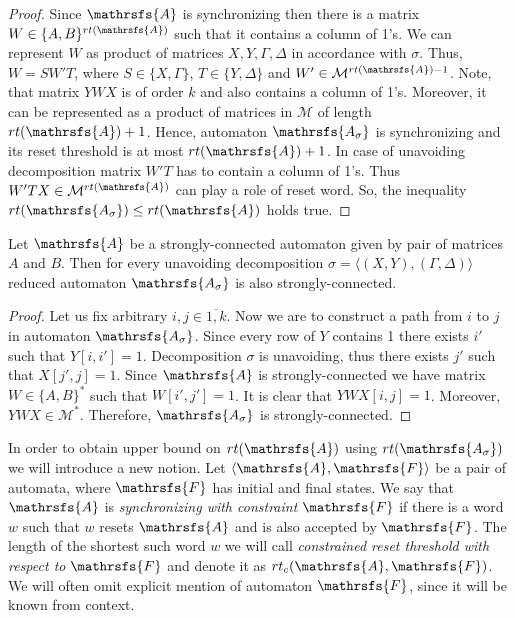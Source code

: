 \documentclass[11pt]{llncs}
\newcommand{\A}{\mathrsfs{A}}
\newcommand{\AD}{\mathrsfs{A_{\sigma}}}
\newcommand{\G}{\Gamma}
\newcommand{\D}{\Delta}
\newcommand{\rt}{rt}
\newcommand{\rtc}{rt_{c}}
\begin{document}
\begin{proof}
Since $\A$ is synchronizing then there is a matrix $W \in \{A, B\}^{\rt(\A)}$ such
that it contains a column of 1's. We can represent $W$ as product of matrices $X,Y,\G,\D$ in 
accordance with $\sigma$. Thus, $W = SW'T$, where $S \in \{X,\G\}$, $T \in \{Y,\D\}$ and $W' \in \mathcal{M}^{\rt(\A) - 1}$.
Note, that matrix $YWX$ is of order $k$ and also contains a column of 1's. Moreover, it can be represented
as a product of matrices in $\mathcal{M}$ of length $\rt(\A) + 1$. Hence, automaton $\AD$ is
synchronizing and its reset threshold is at most $\rt(\A) + 1$.
In case of unavoiding decomposition matrix $W'T$ has to contain a column of 1's.
Thus $W'TX \in \mathcal{M}^{\rt(\A)}$ can play a role of reset word. So, the inequality $\rt(\AD) \leq \rt(\A)$ holds true.
\end{proof}


\begin{proposition}
Let $\A$ be a strongly-connected automaton given by pair of matrices $A$ and $B$.
Then for every unavoiding decomposition $\sigma = \langle(X,Y),(\G,\D)\rangle$ reduced automaton $\AD$
is also strongly-connected.
\end{proposition}

\begin{proof}
Let us fix arbitrary $i,j \in \overline{1,k}$. Now we are to construct a path from $i$ to $j$ 
in automaton $\AD$. Since every row of $Y$ contains 1 there
exists $i'$ such that $Y[i,i'] = 1$. Decomposition $\sigma$ is unavoiding, thus
there exists $j'$ such that $X[j',j] = 1$. Since $\A$ is strongly-connected we have matrix 
$W \in \{A,B\}^*$ such that $W[i',j'] = 1$. It is clear that $YWX[i,j] = 1$. Moreover,
$YWX \in \mathcal{M}^*$. Therefore, $\AD$ is strongly-connected.
\end{proof}
In order to obtain upper bound on $\rt(\A)$ using $\rt(\AD)$ we will introduce a new notion.
Let $\langle \A , \mathrsfs{F} \rangle$ be a pair of automata, where $\mathrsfs{F}$ has initial and final states. 
We say that $\A$ is \emph{synchronizing with constraint} $\mathrsfs{F}$ if there is a word $w$ such that
$w$ resets $\A$ and is also accepted by $\mathrsfs{F}$. The length of the shortest such
word $w$ we will call \emph{constrained reset threshold with respect to} $\mathrsfs{F}$ and denote it as $\rtc(\A, \mathrsfs{F})$.
We will often omit explicit mention of automaton $\mathrsfs{F}$, since it will be known from context.
\end{document}
